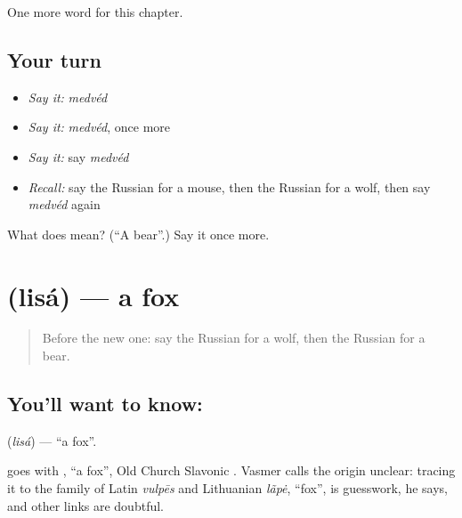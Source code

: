 \begin{grammarlens}[title={What you've built}]
One more word for this chapter.
\end{grammarlens}

\subsection*{Your turn}
\begin{itemize}
\raggedright
  \item \emph{Say it:} \emph{medvéd}
  \item \emph{Say it:} \emph{medvéd}, once more
  \item \emph{Say it:} say \emph{medvéd}
  \item \emph{Recall:} say the Russian for a mouse, then the Russian for a wolf, then say \emph{medvéd} again
\end{itemize}

\begin{tcolorbox}[breakable,colback=teal!4,colframe=teal!35!black,title={Before you move on}]
What does  mean? (\textquotedblleft{}A bear\textquotedblright{}.) Say it once more.
\end{tcolorbox}
\section[\texorpdfstring{\ru{лиса} (lisá)}{лиса (lisá)}]{ (lisá) — a fox}

\label{lesson:RU-C61-fox}



\begin{quote}
Before the new one: say the Russian for a wolf, then the Russian for a bear.
\end{quote}

\subsection*{You'll want to know: }
\textbf{} (\emph{lisá}) — \textquotedblleft{}a fox\textquotedblright{}.

\begin{cousinweb}
\textbf{} goes with \emph{}, \textquotedblleft{}a fox\textquotedblright{}, Old Church Slavonic \emph{}. Vasmer calls the origin unclear: tracing it to the family of Latin \emph{vulpēs} and Lithuanian \emph{lãpė}, \textquotedblleft{}fox\textquotedblright{}, is guesswork, he says, and other links are doubtful.
\end{cousinweb}

